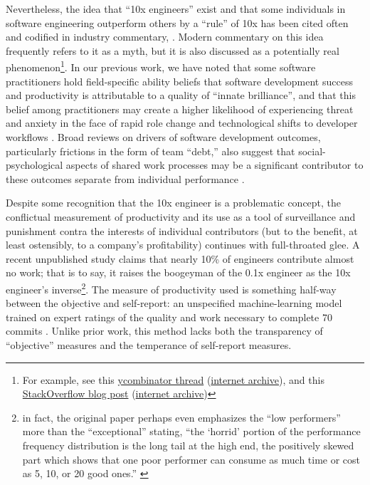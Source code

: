 \documentclass[
  sn-mathphys-ay,
]{sn-jnl}
\begin{document}
Nevertheless, the idea that ``10x engineers'' exist and that some
individuals in software engineering outperform others by a ``rule'' of
10x has been cited often and codified in industry commentary,
\citep[e.g.,][]{brooksMythicalManmonthEssays1975}. Modern commentary on
this idea frequently refers to it as a myth, but it is also discussed as
a potentially real phenomenon\footnote{For example, see this
  \href{https://news.ycombinator.com/item?id=22349531}{ycombinator
  thread}
  (\href{http://web.archive.org/web/20240917164935/https://stackoverflow.blog/2024/06/19/the-real-10x-developer-makes-their-whole-team-better/}{internet
  archive}), and this
  \href{https://stackoverflow.blog/2024/06/19/the-real-10x-developer-makes-their-whole-team-better}{StackOverflow
  blog post}
  (\href{http://web.archive.org/web/20231209171051/https://news.ycombinator.com/item?id=22349531}{internet
  archive})}. In our previous work, we have noted that some software
practitioners hold field-specific ability beliefs that software
development success and productivity is attributable to a quality of
``innate brilliance'', and that this belief among practitioners may
create a higher likelihood of experiencing threat and anxiety in the
face of rapid role change and technological shifts to developer
workflows \citep{hicksNewDeveloperAI2024}. Broad reviews on drivers of
software development outcomes, particularly frictions in the form of
team ``debt,'' also suggest that social-psychological aspects of shared
work processes may be a significant contributor to these outcomes
separate from individual performance \citep{ahmadPandorasBoxSocial2024}.

Despite some recognition that the 10x engineer is a problematic concept,
the conflictual measurement of productivity and its use as a tool of
surveillance and punishment contra the interests of individual
contributors (but to the benefit, at least ostensibly, to a company's
profitability) continues with full-throated glee. A recent unpublished
study claims that nearly 10\% of engineers contribute almost no work;
that is to say, it raises the boogeyman of the 0.1x engineer as the 10x
engineer's inverse\footnote{in fact, the original paper perhaps even
  emphasizes the ``low performers'' more than the ``exceptional''
  stating, ``the `horrid' portion of the performance frequency
  distribution is the long tail at the high end, the positively skewed
  part which shows that one poor performer can consume as much time or
  cost as 5, 10, or 20 good ones.''
  \citep[6]{sackmanExploratoryExperimentalStudies1968}}\citep{obstbaumOngoingResearchSoftware}.
The measure of productivity used is something half-way between the
objective and self-report: an unspecified machine-learning model trained
on expert ratings of the quality and work necessary to complete 70
commits \citep{denisov-blanchPredictingExpertEvaluations2024}. Unlike
prior work, this method lacks both the transparency of ``objective''
measures and the temperance of self-report measures.
\end{document}
